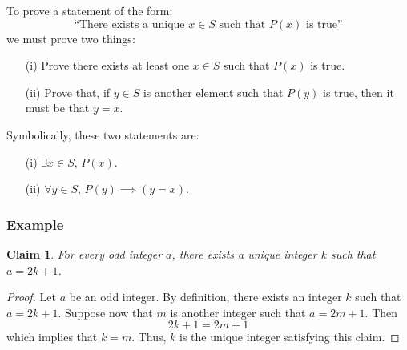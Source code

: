 \documentclass[11pt]{article}
\theoremstyle{plain}
\newtheorem*{claim}{Claim}
\theoremstyle{plain}
\theoremstyle{remark}
\begin{document}
To prove a statement of the form:
\[
 \text{``There exists a unique }x\in S\text{ such that }P(x)\text{ is true''}
\]
we must prove two things:
\begin{enumerate}
 \item[(i)]  Prove there exists at least one $x\in S$ such that $P(x)$ is true.
 \item[(ii)] Prove that, if $y\in S$ is another element such that $P(y)$ is true, then it must be that $y=x$.
\end{enumerate}
Symbolically, these two statements are:
\begin{enumerate}
 \item[(i)]  $\exists x\in S,\, P(x)$.
 \item[(ii)] $\forall y\in S,\, P(y)\implies (y=x)$.
\end{enumerate}


\subsubsection*{Example}
\begin{tcolorbox}
\begin{claim}
 For every odd integer $a$, there exists a unique integer $k$ such that $a=2k+1$.
\end{claim}
\end{tcolorbox}
\begin{proof}
 Let $a$ be an odd integer. By definition, there exists an integer $k$ such that $a=2k+1$. Suppose now that $m$ is another integer such that $a=2m+1$. Then
 \[
  2k+1 = 2m+1
 \]
which implies that $k=m$. Thus, $k$ is the unique integer satisfying this claim.
\end{proof}
\end{document}
